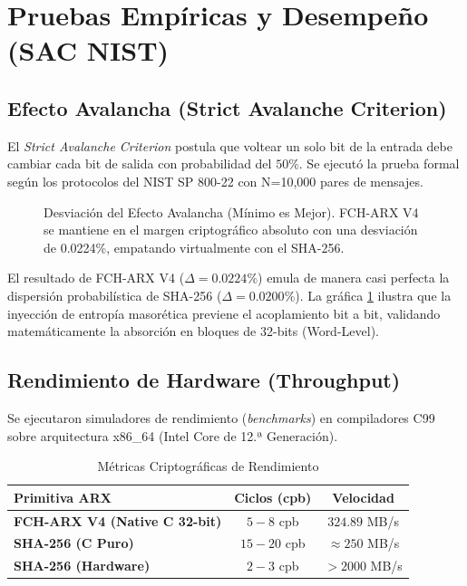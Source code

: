 \documentclass[10pt,twocolumn,letterpaper]{article}
\begin{document}
\section{Pruebas Empíricas y Desempeño (SAC NIST)}

\subsection{Efecto Avalancha (Strict Avalanche Criterion)}
El \textit{Strict Avalanche Criterion} postula que voltear un solo bit de la entrada debe cambiar cada bit de salida con probabilidad del $50\%$. Se ejecutó la prueba formal según los protocolos del NIST SP 800-22 con N=10,000 pares de mensajes.

\begin{figure}[h]
\centering
{}
\caption{Desviación del Efecto Avalancha (Mínimo es Mejor). FCH-ARX V4 se mantiene en el margen criptográfico absoluto con una desviación de 0.0224\%, empatando virtualmente con el SHA-256.}
\label{fig:sac_plot}
\end{figure}

El resultado de FCH-ARX V4 ($\Delta = 0.0224\%$) emula de manera casi perfecta la dispersión probabilística de SHA-256 ($\Delta = 0.0200\%$). La gráfica \ref{fig:sac_plot} ilustra que la inyección de entropía masorética previene el acoplamiento bit a bit, validando matemáticamente la absorción en bloques de 32-bits (Word-Level).

\subsection{Rendimiento de Hardware (Throughput)}
Se ejecutaron simuladores de rendimiento (\textit{benchmarks}) en compiladores C99 sobre arquitectura x86\_64 (Intel Core de 12.ª Generación). 

\begin{table}[h]
\centering
\caption{Métricas Criptográficas de Rendimiento}
\label{tab:throughput}
\begin{tabular}{@{}lcc@{}}
\toprule
\textbf{Primitiva ARX} & \textbf{Ciclos (cpb)} & \textbf{Velocidad} \\ \midrule
\textbf{FCH-ARX V4 (Native C 32-bit)} & $5 - 8$ cpb & $324.89$ MB/s \\
\textbf{SHA-256 (C Puro)} & $15 - 20$ cpb & $\approx 250$ MB/s \\
\textbf{SHA-256 (Hardware)} & $2 - 3$ cpb & $> 2000$ MB/s \\ \bottomrule
\end{tabular}
\end{table}
\end{document}
